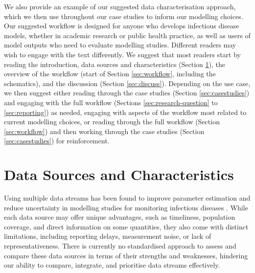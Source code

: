 \documentclass{article}
\begin{document}
We also provide an example of our suggested data characterisation approach, which we then use throughout our case studies to inform our modelling choices.
Our suggested workflow is designed for anyone who develops infectious disease models, whether in academic research or public health practice, as well as users of model outputs who need to evaluate modelling studies. 
Different readers may wish to engage with the text differently.
We suggest that most readers start by reading the introduction, data sources and characteristics (Section \ref{sec:datareview}), the overview of the workflow (start of Section \ref{sec:workflow}, including the schematics), and the discussion (Section \ref{sec:discuss}).
Depending on the use case, we then suggest either reading through the case studies (Section \ref{sec:casestudies}) and engaging with the full workflow (Sections \ref{sec:research-question} to \ref{sec:reporting}) as needed, engaging with aspects of the workflow most related to current modelling choices, or reading through the full workflow (Section \ref{sec:workflow}) and then working through the case studies (Section \ref{sec:casestudies}) for reinforcement.

\section{Data Sources and Characteristics} \label{sec:datareview}

Using multiple data streams has been found to improve parameter estimation and reduce uncertainty in modelling studies for monitoring infectious diseases \citep{deangelis2018analysing, sherratt2021exploring}. While each data source may offer unique advantages, such as timeliness, population coverage, and direct information on some quantities, they also come with distinct limitations, including reporting delays,  measurement noise, or lack of representativeness. There is currently no standardised approach to assess and compare these data sources in terms of their strengths and weaknesses, hindering our ability to compare, integrate, and prioritise data streams effectively. 
\end{document}
